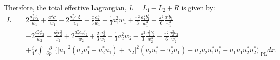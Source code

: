 {\begin{align}
\end{align}
Therefore, the total effective Lagrangian, $\bar{L} = \bar{L}_1 - \bar{L}_2 + \bar{R}$ is given by:
\begin{align} 
\bar{L} =& 2\frac{a_1^2  \dot{\phi}_1}{w_1}+\frac{a_1^2 c_1^2}{w_1} - 2 \frac{a_1^2 c_1 \dot{\xi}_1}{w_1} - \frac{2}{3} \frac{a_1^4}{w_1} +\frac{1}{3} a_1^2 w_1 + \frac{\pi^2}{3} \frac{ a_1^2 b_1^2}{w_1^3} + \frac{\pi^2}{6} \frac{a_1^2 \dot{b}_1}{w_1^3}  \nonumber \\
&- 2\frac{a_2^2  \dot{\phi}_2}{w_2}-\frac{a_2^2 c_2^2}{w_2} + 2 \frac{a_2^2 c_2 \dot{\xi}_2}{w_2} + \frac{2}{3} \frac{a_2^4}{w_2} -\frac{1}{3} a_2^2 w_2 - \frac{\pi^2}{3} \frac{ a_2^2 b_2^2}{w_2^3} - \frac{\pi^2}{6} \frac{a_2^2 \dot{b}_2}{w_2^3} \nonumber \\
&+ \frac{i}{4} \epsilon \int \Big[ \frac{\partial}{\partial p_-} \Big(|u_1|^2( u_2u_1^* - u_2^* u_1) +  |u_2|^2( u_2u_1^* - u_2^* u_1)  + u_2u_2 u_1^*u_1^* - u_1u_1u_2^*u_2^*\Big) \Big]_{\mathrm{PL}} dx . 
\end{align}

}

